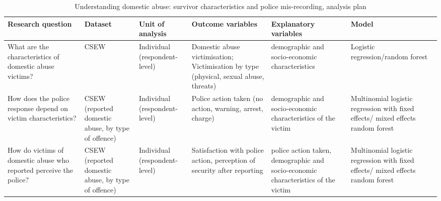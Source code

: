 \documentclass[11pt, a4paper]{article}
\begin{document}
\begin{table}[!htbp]
\caption{Understanding domestic abuse: survivor characteristics and police mis-recording, analysis plan}
  \begin{threeparttable}[t]
  \centering
       \begin{tabular}{ L{2.8cm}  C{1.8cm}  C{1.8cm}  C{3.2cm}  C{2.8cm}  C{2cm} }
    \toprule
     \textbf{Research question} & \textbf{Dataset}    & \textbf{Unit of analysis} & \textbf{Outcome variables} & \textbf{Explanatory variables} & \textbf{Model} \\
    \midrule
    What are the characteristics of domestic abuse victims? & CSEW & Individual (respondent-level) & Domestic abuse victimisation; Victimisation by type (physical, sexual abuse, threats) & demographic and socio-economic characteristics & Logistic regression/random forest \\
        \midrule
    How does the police response depend on victim characteristics? & CSEW (reported domestic abuse, by type of offence) & Individual (respondent-level) & Police action taken (no action, warning, arrest, charge) & demographic and socio-economic characteristics of the victim & Multinomial logistic regression with  fixed effects/ mixed effects random forest \\
     \midrule
    How do victims of domestic abuse who reported perceive the police? & CSEW (reported domestic abuse, by type of offence) & Individual (respondent-level)& Satisfaction with police action, perception of security after reporting & police action taken, demographic and socio-economic characteristics of the victim & Multinomial logistic regression with fixed effects/ mixed effects random forest \\
     \bottomrule
  \end{tabular}
    \end{threeparttable}%
  \label{tab:addlabel}%
\end{table}%
\end{document}
